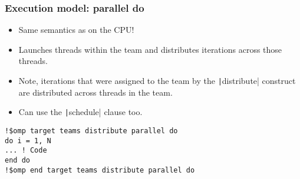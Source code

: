 \documentclass{beamer}
\begin{document}
\begin{frame}[fragile]
\frametitle{Execution model: parallel do}
\begin{itemize}
  \item Same semantics as on the CPU!
  \item Launches threads within the team and distributes iterations across those threads.
  \item Note, iterations that were assigned to the team by the \texttt|distribute| construct are distributed across threads in the team.
  \item Can use the \texttt|schedule| clause too.
\end{itemize}

\begin{verbatim}
!$omp target teams distribute parallel do
do i = 1, N
... ! Code
end do
!$omp end target teams distribute parallel do
\end{verbatim}
\end{frame}
\end{document}
